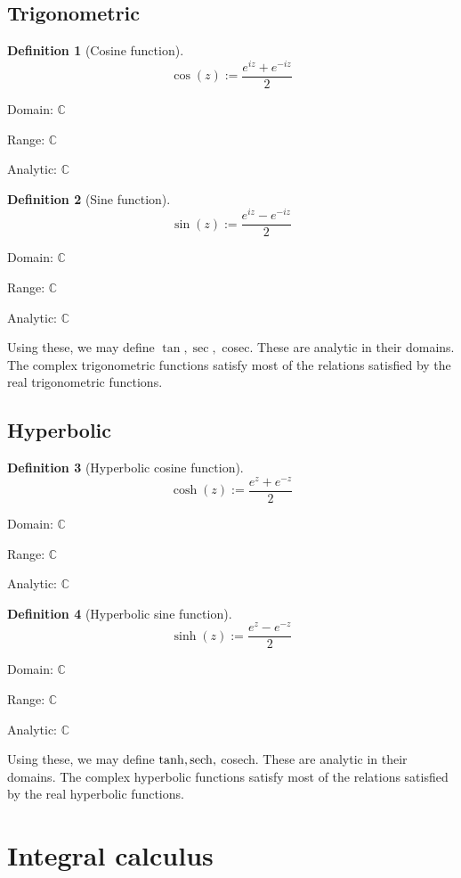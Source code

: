 \documentclass[10pt, a4paper]{extarticle}
\theoremstyle{definition}
\newtheorem{defn}{Definition}
\begin{document}
	\subsection{Trigonometric}
	\begin{defn}[Cosine function]\label{complexcos}
		\[\cos(z):=\frac{e^{iz}+e^{-iz}}{2}\]
		
		Domain: $\mathbb{C}$

		Range: $\mathbb{C}$

		Analytic: $\mathbb{C}$
	\end{defn}
	\begin{defn}[Sine function]
		\[\sin(z):=\frac{e^{iz}-e^{-iz}}{2}\]
		
		Domain: $\mathbb{C}$

		Range: $\mathbb{C}$

		Analytic: $\mathbb{C}$
	\end{defn}
	Using these, we may define $\tan,\sec,$ cosec. These are analytic in their domains. The complex trigonometric functions satisfy most of the relations satisfied by the real trigonometric functions.

	\subsection{Hyperbolic}
	\begin{defn}[Hyperbolic cosine function]
		\[\cosh(z):=\frac{e^{z}+e^{-z}}{2}\]
		
		Domain: $\mathbb{C}$

		Range: $\mathbb{C}$

		Analytic: $\mathbb{C}$
	\end{defn}
	\begin{defn}[Hyperbolic sine function]
		\[\sinh(z):=\frac{e^{z}-e^{-z}}{2}\]
		
		Domain: $\mathbb{C}$

		Range: $\mathbb{C}$

		Analytic: $\mathbb{C}$
	\end{defn}
	Using these, we may define $\tanh,\sech,$ cosech. These are analytic in their domains. The complex hyperbolic functions satisfy most of the relations satisfied by the real hyperbolic functions.

	\section{Integral calculus}
\end{document}
